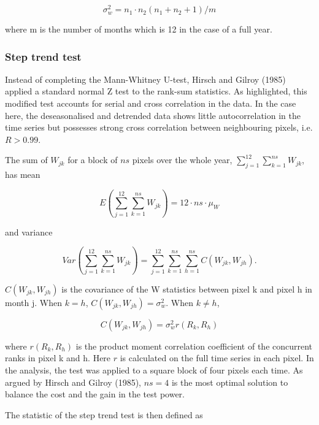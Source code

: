 \documentclass[fleqn,10pt,lineno]{wlpeerj} %
\begin{document}
\begin{equation}
  \sigma^2_w = n_1\cdot n_2(n_1+n_2+1)/m
\end{equation}

where m is the number of months which is 12 in the case of a full year.

\subsubsection{Step trend test}\label{step-trend-test-1}

Instead of completing the Mann-Whitney U-test, Hirsch and Gilroy (1985)
applied a standard normal Z test to the rank-sum statistics. As
highlighted, this modified test accounts for serial and cross
correlation in the data. In the case here, the deseasonalised and
detrended data shows little autocorrelation in the time series but
possesses strong cross correlation between neighbouring pixels, i.e.
\(R>0.99\).

The sum of \(W_{jk}\) for a block of \(ns\) pixels over the whole year,
\(\sum_{j=1}^{12}\sum_{k=1}^{ns}W_{jk}\), has mean

\begin{equation}
  E(\sum_{j=1}^{12}\sum_{k=1}^{ns}W_{jk})=12\cdot ns\cdot\mu_W
\end{equation}

and variance

\begin{equation}
  Var(\sum_{j=1}^{12}\sum_{k=1}^{ns}W_{jk})=\sum_{j=1}^{12}\sum_{k=1}^{ns}\sum_{h=1}^{ns}C(W_{jk},W_{jh}).
\end{equation}

\(C(W_{jk},W_{jh})\) is the covariance of the W statistics between pixel
k and pixel h in month j. When \(k=h\), \(C(W_{jk},W_{jh})=\sigma^2_w\).
When \(k\neq h\),

\begin{equation}
  C(W_{jk},W_{jh})=\sigma^2_w r(R_k,R_h)
\end{equation}

where \(r(R_k,R_h)\) is the product moment correlation coefficient of
the concurrent ranks in pixel k and h. Here \(r\) is calculated on the
full time series in each pixel. In the analysis, the test was applied to
a square block of four pixels each time. As argued by Hirsch and Gilroy
(1985), \(ns=4\) is the most optimal solution to balance the cost and
the gain in the test power.

The statistic of the step trend test is then defined as
\end{document}
